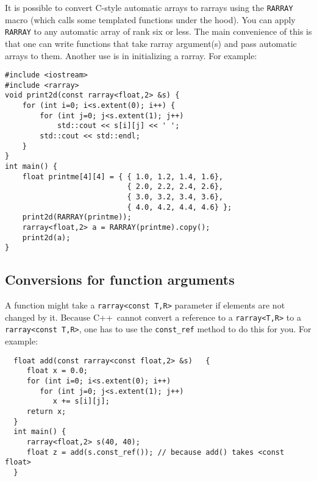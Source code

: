 \documentclass[11pt,twoside]{article}
\newcommand{\cxx}{C{++}}
\begin{document}
It is possible to convert C-style automatic arrays to rarrays using the {\tt RARRAY} macro (which calls some templated functions under the hood).  You can apply {\tt RARRAY} to any automatic array of rank six or less. 
The main convenience of this is that one can write functions that take rarray argument(s) and pass automatic arrays to them. Another use is in initializing a rarray. For example:
\vspace{-5pt}\begin{framed}\vspace{-14pt}%
\begin{verbatim}
#include <iostream>
#include <rarray>
void print2d(const rarray<float,2> &s) {
    for (int i=0; i<s.extent(0); i++) {
        for (int j=0; j<s.extent(1); j++)
            std::cout << s[i][j] << ' ';
        std::cout << std::endl;
    }
}
int main() {
    float printme[4][4] = { { 1.0, 1.2, 1.4, 1.6},
                            { 2.0, 2.2, 2.4, 2.6},
                            { 3.0, 3.2, 3.4, 3.6},
                            { 4.0, 4.2, 4.4, 4.6} };
    print2d(RARRAY(printme));
    rarray<float,2> a = RARRAY(printme).copy();
    print2d(a);
}
\end{verbatim}%
\vspace{-14pt}\end{framed}\vspace{-8pt}



\subsection{Conversions for function arguments}

A function might take a \texttt{rarray{\tt<}const T,R{\tt>}} parameter if elements are not changed by it. Because \cxx\ cannot convert a reference to a \texttt{rarray{\tt<}T,R{\tt>}} to a \texttt{rarray{\tt<}const T,R{\tt>}}, one has to use the \texttt{const\_ref} method to do this for you.
For example:
\vspace{-5pt}\begin{framed}\vspace{-14pt}%
\begin{verbatim}
  float add(const rarray<const float,2> &s)   {
     float x = 0.0;
     for (int i=0; i<s.extent(0); i++)
        for (int j=0; j<s.extent(1); j++)
           x += s[i][j];
     return x;
  }
  int main() {
     rarray<float,2> s(40, 40);
     float z = add(s.const_ref()); // because add() takes <const float>
  }
\end{verbatim}%
\vspace{-14pt}
\end{framed}\vspace{-8pt}
\end{document}
